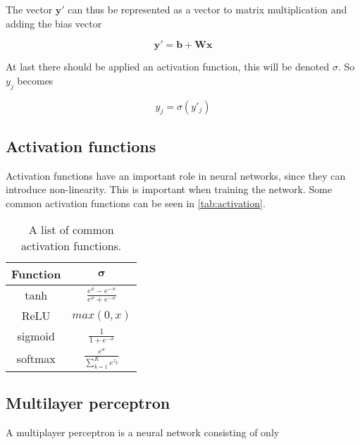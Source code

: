 \documentclass{article}
\begin{document}
The vector $\bm{y'}$ can thus be represented as a vector to matrix multiplication and adding the bias vector

$$\bm{y'} = \bm{b} + \bm{W}\bm{x}$$

At last there should be applied an activation function, this will be denoted $\sigma$.
So $y_j$ becomes

$$y_j = \sigma \left(y'_j\right)$$

\subsection{Activation functions}%
\label{sub:Activation functions}

Activation functions have an important role in neural networks, since they can introduce non-linearity. This is important when training the network.
Some common activation functions can be seen in \autoref{tab:activation}.

\begin{table}[H]
\centering
\begin{tabular}{|c|c|}\hline
\textbf{Function} & $\bm{\sigma}$ \\\hline
tanh     & $\frac{e^x - e^{-x}}{e^x + e^{-x}}$ \\\hline
ReLU     & $max(0, x)$ \\\hline
sigmoid  & $\frac{1}{1+e^{-x}}$ \\\hline
softmax  & $\frac{e^x}{\sum^K_{k=1} e^{z_k}}$ \\\hline
\end{tabular}
\caption{A list of common activation functions.}
\label{tab:activation}
\end{table}

\subsection{Multilayer perceptron}%
\label{sub:Multilayer perceptron}

A multiplayer perceptron is a neural network consisting of only 
\end{document}
